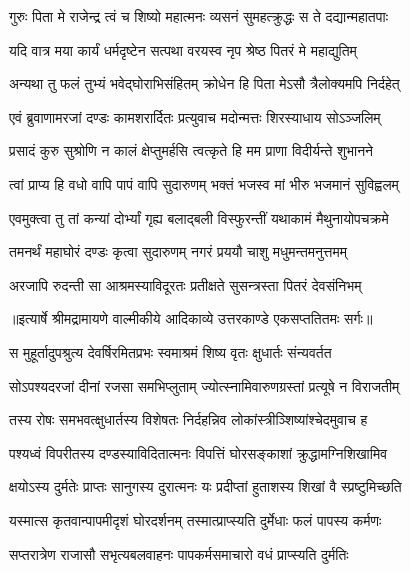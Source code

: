 \twolineshloka
{गुरुः पिता मे राजेन्द्र त्वं च शिष्यो महात्मनः}
{व्यसनं सुमहत्क्रुद्धः स ते दद्यान्महातपाः} %

\twolineshloka
{यदि वात्र मया कार्यं धर्मदृष्टेन सत्पथा}
{वरयस्व नृप श्रेष्ठ पितरं मे महाद्युतिम्} %

\twolineshloka
{अन्यथा तु फलं तुभ्यं भवेद्घोराभिसंहितम्}
{क्रोधेन हि पिता मेऽसौ त्रैलोक्यमपि निर्दहेत्} %

\twolineshloka
{एवं ब्रुवाणामरजां दण्डः कामशरार्दितः}
{प्रत्युवाच मदोन्मत्तः शिरस्याधाय सोऽञ्जलिम्} %

\twolineshloka
{प्रसादं कुरु सुश्रोणि न कालं क्षेप्तुमर्हसि}
{त्वत्कृते हि मम प्राणा विदीर्यन्ते शुभानने} %

\twolineshloka
{त्वां प्राप्य हि वधो वापि पापं वापि सुदारुणम्}
{भक्तं भजस्व मां भीरु भजमानं सुविह्वलम्} %

\twolineshloka
{एवमुक्त्वा तु तां कन्यां दोर्भ्यां गृह्य बलाद्बली}
{विस्फुरन्तीं यथाकामं मैथुनायोपचक्रमे} %

\twolineshloka
{तमनर्थं महाघोरं दण्डः कृत्वा सुदारुणम्}
{नगरं प्रययौ चाशु मधुमन्तमनुत्तमम्} %

\twolineshloka
{अरजापि रुदन्ती सा आश्रमस्याविदूरतः}
{प्रतीक्षते सुसन्त्रस्ता पितरं देवसंनिभम्} %


{॥इत्यार्षे श्रीमद्रामायणे वाल्मीकीये आदिकाव्ये उत्तरकाण्डे एकसप्ततितमः सर्गः॥}


\twolineshloka
{स मुहूर्तादुपश्रुत्य देवर्षिरमितप्रभः}
{स्वमाश्रमं शिष्य वृतः क्षुधार्तः संन्यवर्तत} %

\twolineshloka
{सोऽपश्यदरजां दीनां रजसा समभिप्लुताम्}
{ज्योत्स्नामिवारुणग्रस्तां प्रत्यूषे न विराजतीम्} %

\twolineshloka
{तस्य रोषः समभवत्क्षुधार्तस्य विशेषतः}
{निर्दहन्निव लोकांस्त्रीञ्शिष्यांश्चेदमुवाच ह} %

\twolineshloka
{पश्यध्वं विपरीतस्य दण्डस्याविदितात्मनः}
{विपत्तिं घोरसङ्काशां क्रुद्धामग्निशिखामिव} %

\twolineshloka
{क्षयोऽस्य दुर्मतेः प्राप्तः सानुगस्य दुरात्मनः}
{यः प्रदीप्तां हुताशस्य शिखां वै स्प्रष्टुमिच्छति} %

\twolineshloka
{यस्मात्स कृतवान्पापमीदृशं घोरदर्शनम्}
{तस्मात्प्राप्स्यति दुर्मेधाः फलं पापस्य कर्मणः} %

\twolineshloka
{सप्तरात्रेण राजासौ सभृत्यबलवाहनः}
{पापकर्मसमाचारो वधं प्राप्स्यति दुर्मतिः} %

